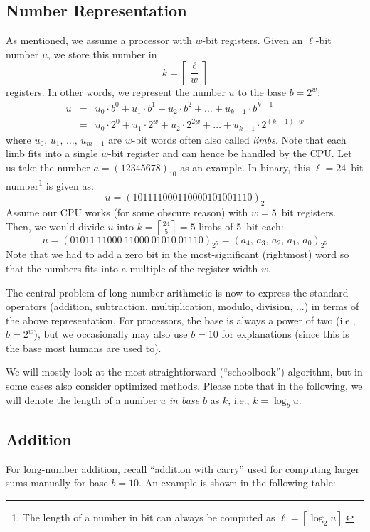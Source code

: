 \subsection{Number Representation}
As mentioned, we assume a processor with $w$-bit registers. Given an $\ell$-bit number $u$, we store this number in 
$$
k = \left\lceil \frac{\ell}{w}\right\rceil
$$
registers. In other words, we represent the number $u$ to the base $b = 2^w$:
\begin{eqnarray}
u &=& u_0 \cdot b^0 + u_1 \cdot b^1 + u_2 \cdot b^2 + \ldots + u_{k-1} \cdot b^{k-1}  \nonumber \\
  &=& u_0 \cdot 2^0 + u_1 \cdot 2^w + u_2 \cdot 2^{2w} + \ldots + u_{k-1} \cdot 2^{\left(k-1\right)\cdot w} \nonumber
\end{eqnarray}
where $u_0,\,u_1,\,\ldots,\,u_{m-1}$ are $w$-bit words often also called \emph{limbs}. Note that each limb fits into a single $w$-bit register and can hence be handled by the \ac{CPU}.
Let us take the number $a = \left(12345678\right)_{10}$ as an example. In binary, this $\ell = 24$~bit number\footnote{The length of a number in bit can always be computed as $\ell = \left\lceil \log_2{u} \right\rceil$.} is given as:
$$
u = \left(101111000110000101001110\right)_2
$$
Assume our \ac{CPU} works (for some obscure reason) with $w = 5$~bit registers. Then,  we would divide $u$ into $k = \left\lceil \frac{24}{5}\right\rceil = 5$ limbs of 5~bit each:
$$
u = \left(01011\ 11000\ 11000\ 01010\ 01110\right)_{2^5} = (a_4,\,a_3,\,a_2,\,a_1,\,a_0)_{2^5}
$$
Note that we had to add a zero bit in the most-significant (rightmost) word so that the numbers fits into a multiple of the register width $w$. 

The central problem of long-number arithmetic is now to express the standard operators (addition, subtraction, multiplication, modulo, division, ...) in terms of the above representation. For processors, the base is always a power of two (i.e., $b = 2^w$), but we occasionally may also use $b = 10$ for explanations (since this is the base most humans are used to).

We will mostly look at the most straightforward (``schoolbook'') algorithm, but in some cases also consider optimized methods. Please note that in the following, we will denote the length of a number $u$ \emph{in base $b$} as $k$, i.e., $k = \log_b u$.

\subsection{Addition}
For long-number addition, recall ``addition with carry'' used for computing larger sums manually for base $b = 10$. An example is shown in the following table:

